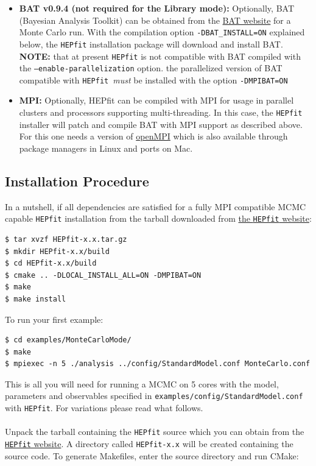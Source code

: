 \documentclass[preprint,3p,12pt]{elsarticle}
\newcommand{\HEPfit}{\texttt{HEPfit}\xspace}
\begin{document}
{\begin{itemize}
\item {\bf BAT v0.9.4 (not required for the Library mode):} Optionally, BAT (Bayesian Analysis Toolkit) can be obtained from 
    the \href{https://www.mppmu.mpg.de/bat/}{BAT website} for a Monte Carlo run. With the compilation 
    option \texttt{-DBAT\_INSTALL=ON} explained below, the \HEPfit installation package 
    will download and install BAT. {\bf NOTE:} that at present \HEPfit is not
    compatible with BAT compiled with the \texttt{--enable-parallelization} option. the parallelized version of BAT compatible with \HEPfit\ {\em must} be installed with the option \texttt{-DMPIBAT=ON}

\item {\bf MPI:}    Optionally, HEPfit can be compiled with MPI for usage in parallel 
    clusters and processors supporting multi-threading. In this case,
    the \HEPfit installer will patch and compile BAT with MPI support as described above. For this one needs a version of \href{https://www.open-mpi.org/}{openMPI} which is also available through package managers in Linux and ports on Mac.
\end{itemize}

\subsection{Installation Procedure}

In a nutshell, if all dependencies are satisfied for a fully MPI compatible MCMC capable \HEPfit installation from the tarball downloaded from \href{http://hepfit.roma1.infn.it/}{the \HEPfit website}:

\begin{lstlisting}
$ tar xvzf HEPfit-x.x.tar.gz
$ mkdir HEPfit-x.x/build 
$ cd HEPfit-x.x/build 
$ cmake .. -DLOCAL_INSTALL_ALL=ON -DMPIBAT=ON
$ make
$ make install
\end{lstlisting}
To run your first example:
\begin{lstlisting} 
$ cd examples/MonteCarloMode/
$ make  
$ mpiexec -n 5 ./analysis ../config/StandardModel.conf MonteCarlo.conf
\end{lstlisting} 
This is all you will need for running a MCMC on 5 cores with the model, parameters and observables specified in \texttt{examples/config/StandardModel.conf} with \HEPfit. For variations please read what follows. \\\\
%
Unpack the tarball containing the \HEPfit source which you can obtain from the \href{http://hepfit.roma1.infn.it/}{\HEPfit website}. A directory called 
\texttt{HEPfit-x.x} will be created containing the source code. To generate 
Makefiles, enter the source directory and run CMake:

}
\end{document}
